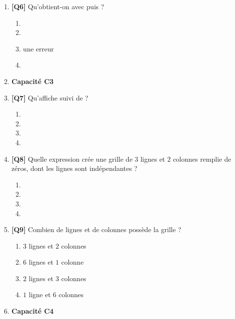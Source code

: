\begin{enumerate}
\item \textbf{[Q6]} Qu'obtient-on avec  puis  ?
  \begin{enumerate}[label=\Alph*.]
    \item {}
    \item {}
    \item une erreur 
    \item {}
  \end{enumerate}

\item[] \textbf{Capacité C3}

\item \textbf{[Q7]} Qu'affiche  suivi de  ?
  \begin{enumerate}[label=\Alph*.]
    \item {}
    \item {}
    \item {}
    \item {}
  \end{enumerate}

\item \textbf{[Q8]} Quelle expression crée une grille de $3$ lignes et $2$ colonnes remplie de zéros, dont les lignes sont indépendantes ?
  \begin{enumerate}[label=\Alph*.]
    \item {}
    \item {}
    \item {}
    \item {}
  \end{enumerate}

\item \textbf{[Q9]} Combien de lignes et de colonnes possède la grille  ?
  \begin{enumerate}[label=\Alph*.]
    \item $3$ lignes et $2$ colonnes
    \item $6$ lignes et $1$ colonne
    \item $2$ lignes et $3$ colonnes
    \item $1$ ligne et $6$ colonnes
  \end{enumerate}

\item[] \textbf{Capacité C4}


\end{enumerate}
